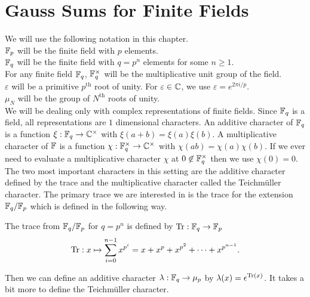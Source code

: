 \section{Gauss Sums for Finite Fields}
\noindent We will use the following notation in this chapter.\\
$\mathbb{F}_p$ will be the finite field with $p$ elements.\\
$\mathbb{F}_q$ will be the finite field with $q = p^n$ elements for some $n \geq 1$.\\
For any finite field $\mathbb{F}_q$, $\mathbb{F}_q^\times$ will be the multiplicative unit group of the field.\\
$\varepsilon$ will be a primitive $p^\text{th}$ root of unity. For $\varepsilon \in \mathbb{C}$, we use $\varepsilon = e^{2 \pi i /p}$.\\
$\mu_N$ will be the group of $N^\text{th}$ roots of unity.\\

We will be dealing only with complex representations of finite fields.
Since $\mathbb{F}_q$ is a field, all representations are $1$ dimensional characters.
An additive character of $\mathbb{F}_q$ is a function $\xi : \mathbb{F}_q \to \mathbb{C}^\times$ with $\xi(a + b) = \xi(a)\xi(b)$.
A multiplicative character of $\mathbb{F}$ is a function $\chi : \mathbb{F}_q^\times \to \mathbb{C}^\times$ with $\chi(ab) = \chi(a)\chi(b)$.
If we ever need to evaluate a multiplicative character $\chi$ at $0 \not \in \mathbb{F}_q^\times$ then we use $\chi(0) = 0$. \\

The two most important characters in this setting are the additive character defined by the trace and the multiplicative character called the Teichm\"uller character. 
The primary trace we are interested in is the trace for the extension $\mathbb{F}_q / \mathbb{F}_p$ which is defined in the following way.
\begin{defn}
The trace from $\mathbb{F}_q / \mathbb{F}_p$ for $q = p^n$ is defined by $\textrm{Tr} : \mathbb{F}_q \to \mathbb{F}_p$
 \[ \textrm{Tr} : x \mapsto \sum_{i=0}^{n-1} x^{p^i} = x + x^p + x^{p^2} + \cdots + x^{p^{n-1}}.\]
\end{defn}
\noindent Then we can define an additive character $\lambda : \mathbb{F}_q \to \mu_p$ by $\lambda(x) = \epsilon^{\textrm{Tr}(x)}$.
It takes a bit more to define the Teichm\"uller character.\\

